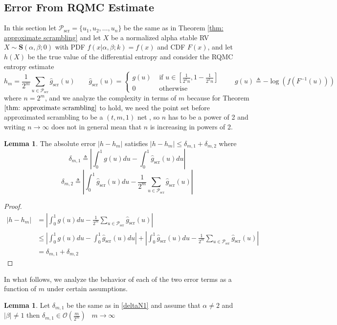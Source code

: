 \documentclass{article}
\theoremstyle{definition}
\newtheorem{lemma}[definition]{Lemma}
\begin{document}
\subsection{Error From RQMC Estimate}
In this section   let $\mathcal{P}_{\text{scr}}=\{u_1,u_2,\ldots,u_n\}$ be the same as in Theorem \ref{thm: approximate scrambling} and let $X$ be a normalized alpha stable RV $X\sim\mathbf{S}(\alpha,\beta;0)$ with PDF $f(x|\alpha,\beta;k)=f(x)$ and CDF $F(x)$, and let $h(X)$ be the true value of the differential entropy and consider the RQMC entropy estimate \begin{equation}
    h_m=\frac{1}{2^m}\sum_{u\in\mathcal{P}_{\text{scr}}}\hat{g}_{\text{scr}}(u) \qquad 
\hat{g}_{\text{scr}}(u)=\begin{cases} g(u) & \text{ if } u \in \left[\frac{1}{2^{k}n} , 1-\frac{1}{2^{k}n}\right]\\
0 & \text{ otherwise }
    \end{cases}
\qquad g(u) \triangleq -\log(f(F^{-1}(u)))
\end{equation} 
where $n=2^m$, and we analyze the complexity in terms of $m$ because for Theorem $\ref{thm: approximate scrambling}$ to hold, we need the point set before approximated scrambling to be a $(t,m,1)$ net , so $n$ has to be a power of 2 and writing $n\to\infty$ does not in general mean that $n$ is increasing in powers of 2. 
\begin{lemma}
\label{lem: general error}The absolute error \(\lvert h-h_m\rvert\) satisfies  \(\lvert h-h_m\rvert\leq\delta_{m,1} + \delta_{m,2}\) where \begin{equation}\label{deltaN1}
\delta_{m,1}\triangleq \left\lvert \int_0^1g(u)du-\int_0^1\hat{g}_{\text{scr}}(u)du\right\rvert
\end{equation}
\begin{equation}
\label{deltaN2}
\delta_{m,2}\triangleq\left\lvert \int_0^1\hat{g}_{\text{scr}}(u)du-\frac{1}{2^m}\sum_{u\in\mathcal{P}_{\text{scr}}}\hat{g}_{\text{scr}}(u)\right\rvert
\end{equation}
\end{lemma}
\begin{proof}
\begin{align*}
 \lvert h-h_m\rvert
 &=\left\lvert \int_0^1g(u)du-\frac{1}{2^m}\sum_{u\in\mathcal{P}_{\text{scr}}}\hat{g}_{\text{scr}}(u)\right\rvert\\
&\leq \left\lvert \int_0^1g(u)du-\int_0^1\hat{g}_{\text{scr}}(u)du\right\rvert+ \left\lvert \int_0^1\hat{g}_{\text{scr}}(u)du-\frac{1}{2^m}\sum_{u\in\mathcal{P}_{\text{scr}}}\hat{g}_{\text{scr}}(u)\right\rvert \\
&= \delta_{m,1} + \delta_{m,2}
\end{align*}
\end{proof}
\noindent In what follows, we analyze the behavior of each of the two error terms as a function of $m$ under certain assumptions. 
\begin{lemma}
\label{lem:del1}Let $\delta_{m,1}$ be the same as in \eqref{deltaN1} and assume that $\alpha\neq2$ and $\lvert \beta\rvert \neq 1$ then $\delta_{m,1}\in\mathcal{O}\left(\frac{m}{2^m}\right)\;\;\;m\to\infty$\end{lemma}
\end{document}
